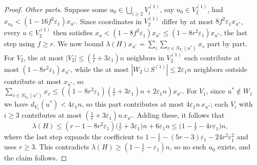 \documentclass[10pt,a4paper]{amsart}
\newcommand{\eps}{\varepsilon}
\renewcommand{\ge}{\geqslant}
\renewcommand{\le}{\leqslant}
\begin{document}
\begin{proof}
\emph{Other parts.} Suppose some
$u_0\in\bigcup_{i\ge2}V_i^{(1)}$, say $u_0\in V_2^{(1)}$,
had $x_{u_0}<(1-16f^2\eps_1)x_{u^\ast}$. Since coordinates
in $V_2^{(1)}$ differ by at most $8f^2\eps_1x_{u^\ast}$,
every $u\in V_2^{(1)}$ then satisfies
$x_u<(1-8f^2\eps_1)x_{u^\ast}\le(1-8r^2\eps_1)x_{u^\ast}$,
the last step using $f\ge r$. We now bound
$\lambda(H)x_{u^\ast}=\sum_i\sum_{v\in N_{V_i}(u^\ast)}x_v$
part by part. For $V_2$, the at most
$|V_2|\le(\tfrac1r+3\eps_1)n$ neighbors in $V_2^{(1)}$ each
contribute at most $(1-8r^2\eps_1)x_{u^\ast}$, while the at most
$|W_2\cup S^{(1)}|\le2\eps_1n$ neighbors outside contribute
at most $ x_{u^\ast}$, so
$\sum_{v\in N_{V_2}(u^\ast)}x_v
\le \left((1-8r^2\eps_1)(\tfrac1r+3\eps_1)n+2\eps_1n \right) x_{u^\ast}$. For $V_1$, since
$u^\ast\notin W_1$ we have $d_{V_1}(u^\ast)<4\eps_1n$, so
this part contributes at most $4\eps_1n\,x_{u^\ast}$; each
$V_i$ with $i\ge3$ contributes at most
$(\tfrac1r+3\eps_1)n\,x_{u^\ast}$. 
Adding these, it follows that 
\[
  \lambda(H)
  \le(r-1-8r^2\eps_1)\bigl(\tfrac1r+3\eps_1\bigr)n+6\eps_1n
  \le\bigl(1-\tfrac1r-4r\eps_1\bigr)n,
\]
where the last step expands the coefficient to
$1-\tfrac1r-(5r-3)\eps_1-24r^2\eps_1^2$ and uses $r\ge3$.
This contradicts $\lambda(H)\ge(1-\tfrac1r-\eps_1)n$, so no
such $u_0$ exists, and the claim follows.
\end{proof} 
\end{document}
